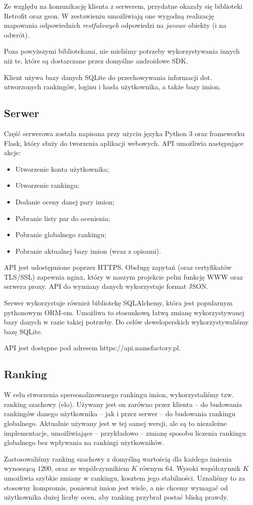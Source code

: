 \documentclass[12pt,a4paper]{article}
\begin{document}
Ze względu na komunikację klienta z serwerem, przydatne okazały się biblioteki Retrofit oraz gson.
W zestawieniu umożliwiają one wygodną realizację mapowania odpowiednich \textit{restfulowych} odpowiedzi na \textit{javowe} obiekty (i na odwrót).

Poza powyższymi bibliotekami, nie mieliśmy potrzeby wykorzystywania innych niż te, które są dostarczane przez domyślne androidowe SDK.

Klient używa bazy danych SQLite do przechowywania informacji dot. utworzonych rankingów, loginu i hasła użytkownika, a także bazy imion.

\subsection{Serwer}
Część serwerowa została napisana przy użyciu języka Python 3 oraz frameworku Flask, który służy do tworzenia aplikacji webowych.
API umożliwia następujące akcje:

\begin{itemize}
    \item Utworzenie konta użytkownika;
    \item Utworzenie rankingu;
    \item Dodanie oceny danej pary imion;
    \item Pobranie listy par do ocenienia;
    \item Pobranie globalnego rankingu;
    \item Pobranie aktualnej bazy imion (wraz z opisami).
\end{itemize}

API jest udostępnione poprzez HTTPS.
Obsługę zapytań (oraz certyfikatów TLS/SSL) zapewnia nginx, który w naszym projekcie pełni funkcję WWW oraz serwera proxy.
API do wymiany danych wykorzystuje format JSON.

Serwer wykorzystuje również bibliotekę SQLAlchemy, która jest popularnym pythonowym ORM-em.
Umożliwa to stosunkową łatwą zmianę wykorzystywanej bazy danych w razie takiej potrzeby.
Do celów deweloperskich wykorzystywaliśmy bazę SQLite.

API jest dostępne pod adresem https://api.namefactory.pl.

\subsection{Ranking}
W celu stworzenia spersonalizowanego rankingu imion, wykorzystaliśmy tzw. ranking szachowy (elo).
Używany jest on zarówno przez klienta -- do budowania rankingów danego użytkownika -- jak i przez serwer -- do budowania rankingu globalnego.
Aktualnie używany jest w tej samej wersji, ale są to niezależne implementacje, umożliwiające -- przykładowo -- zmianę sposobu liczenia rankingu globalnego bez wpływania na rankingi użytkowników.

Zastosowaliśmy ranking szachowy z domyślną wartością dla każdego imienia wynoszącą \(1200\), oraz ze współczynnikiem \(K\) równym \(64\).
Wysoki współczynnik \(K\) umożliwia szybkie zmiany w rankingu, kosztem jego stabilności.
Uznaliśmy to za stosowny kompromis, ponieważ imion jest wiele, a nie chcemy wymagać od użytkownika dużej liczby ocen, aby ranking przybrał postać bliską prawdy.
\end{document}
